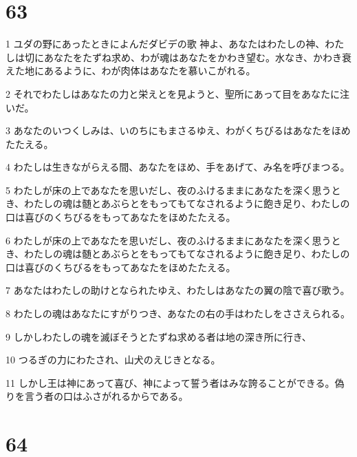 \chapter{63}

\par 1 ユダの野にあったときによんだダビデの歌 神よ、あなたはわたしの神、わたしは切にあなたをたずね求め、わが魂はあなたをかわき望む。水なき、かわき衰えた地にあるように、わが肉体はあなたを慕いこがれる。
\par 2 それでわたしはあなたの力と栄えとを見ようと、聖所にあって目をあなたに注いだ。
\par 3 あなたのいつくしみは、いのちにもまさるゆえ、わがくちびるはあなたをほめたたえる。
\par 4 わたしは生きながらえる間、あなたをほめ、手をあげて、み名を呼びまつる。
\par 5 わたしが床の上であなたを思いだし、夜のふけるままにあなたを深く思うとき、わたしの魂は髄とあぶらとをもってもてなされるように飽き足り、わたしの口は喜びのくちびるをもってあなたをほめたたえる。
\par 6 わたしが床の上であなたを思いだし、夜のふけるままにあなたを深く思うとき、わたしの魂は髄とあぶらとをもってもてなされるように飽き足り、わたしの口は喜びのくちびるをもってあなたをほめたたえる。
\par 7 あなたはわたしの助けとなられたゆえ、わたしはあなたの翼の陰で喜び歌う。
\par 8 わたしの魂はあなたにすがりつき、あなたの右の手はわたしをささえられる。
\par 9 しかしわたしの魂を滅ぼそうとたずね求める者は地の深き所に行き、
\par 10 つるぎの力にわたされ、山犬のえじきとなる。
\par 11 しかし王は神にあって喜び、神によって誓う者はみな誇ることができる。偽りを言う者の口はふさがれるからである。

\chapter{64}

